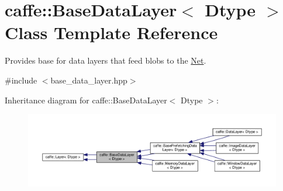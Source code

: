 \hypertarget{classcaffe_1_1_base_data_layer}{}\section{caffe\+:\+:Base\+Data\+Layer$<$ Dtype $>$ Class Template Reference}
\label{classcaffe_1_1_base_data_layer}


Provides base for data layers that feed blobs to the \mbox{\hyperlink{classcaffe_1_1_net}{Net}}.  




{\ttfamily \#include $<$base\+\_\+data\+\_\+layer.\+hpp$>$}



Inheritance diagram for caffe\+:\+:Base\+Data\+Layer$<$ Dtype $>$\+:
\nopagebreak
\begin{figure}[H]
\begin{center}
\leavevmode
\includegraphics[width=350pt]{classcaffe_1_1_base_data_layer__inherit__graph}
\end{center}
\end{figure}
